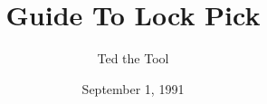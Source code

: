 \begin{titlepage}
\title{Guide To Lock Pick}
\author{Ted the Tool}
\date{September 1, 1991}
\maketitle
\end{titlepage}
